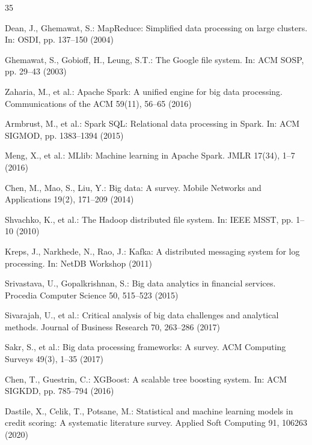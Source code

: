 \documentclass[preprint,12pt,authoryear]{elsarticle}
\begin{document}

\begin{thebibliography}{35}

Dean, J., Ghemawat, S.: MapReduce: Simplified data processing on large clusters. In: OSDI, pp. 137--150 (2004)

Ghemawat, S., Gobioff, H., Leung, S.T.: The Google file system. In: ACM SOSP, pp. 29--43 (2003)

Zaharia, M., et al.: Apache Spark: A unified engine for big data processing. Communications of the ACM 59(11), 56--65 (2016)

Armbrust, M., et al.: Spark SQL: Relational data processing in Spark. In: ACM SIGMOD, pp. 1383--1394 (2015)

Meng, X., et al.: MLlib: Machine learning in Apache Spark. JMLR 17(34), 1--7 (2016)

Chen, M., Mao, S., Liu, Y.: Big data: A survey. Mobile Networks and Applications 19(2), 171--209 (2014)

Shvachko, K., et al.: The Hadoop distributed file system. In: IEEE MSST, pp. 1--10 (2010)

Kreps, J., Narkhede, N., Rao, J.: Kafka: A distributed messaging system for log processing. In: NetDB Workshop (2011)

Srivastava, U., Gopalkrishnan, S.: Big data analytics in financial services. Procedia Computer Science 50, 515--523 (2015)

Sivarajah, U., et al.: Critical analysis of big data challenges and analytical methods. Journal of Business Research 70, 263--286 (2017)

Sakr, S., et al.: Big data processing frameworks: A survey. ACM Computing Surveys 49(3), 1--35 (2017)

Chen, T., Guestrin, C.: XGBoost: A scalable tree boosting system. In: ACM SIGKDD, pp. 785--794 (2016)

Dastile, X., Celik, T., Potsane, M.: Statistical and machine learning models in credit scoring: A systematic literature survey. Applied Soft Computing 91, 106263 (2020)


\end{thebibliography}
\end{document}
